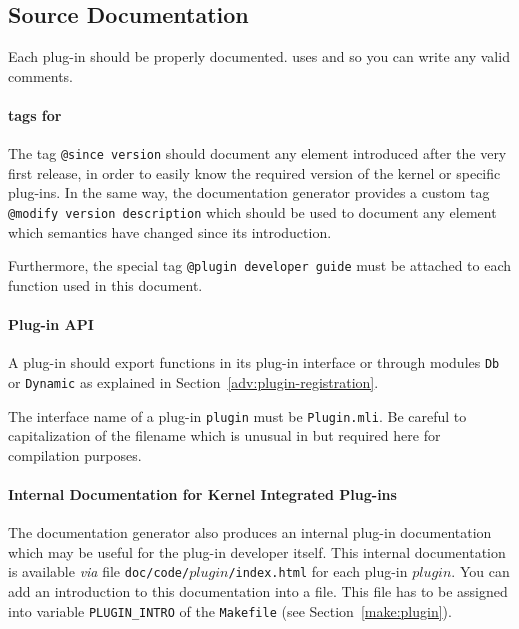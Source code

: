 \subsection{Source Documentation}\label{doc:plugin}

Each plug-in should be properly documented. \framac uses \ocamldoc and so you
can write any valid \ocamldoc comments.

\paragraph{\ocamldoc tags for \framac} The tag
\texttt{@since version} should document any element introduced after the very
first release, in order to easily know the required version of the \framac
kernel or specific plug-ins. In the same way, the \framac documentation
generator provides a custom tag \texttt{@modify version description} which
should be used to document any element which semantics have changed since its
introduction.

Furthermore, the special tag \texttt{@plugin developer guide} must be attached
to each function used in this document.

\paragraph{Plug-in API}

A plug-in should export functions in its plug-in interface or through modules
\texttt{Db} or \texttt{Dynamic} as explained in
Section~\ref{adv:plugin-registration}.

\begin{important}
The interface name of a plug-in \texttt{plugin} must be \texttt{Plugin.mli}. Be
careful to capitalization of the filename which is unusual in \caml but
required here for compilation purposes.
\end{important}

\paragraph{Internal Documentation for Kernel Integrated Plug-ins}

The \framac documentation generator also produces an internal plug-in
documentation which may be useful for the plug-in developer itself. This
internal documentation is available \emph{via} file
\texttt{doc/code/$plugin$/index.html} for each plug-in
$plugin$. You can add an introduction to this documentation into a file. This
file has to be assigned into variable
\texttt{PLUGIN\_INTRO} of the
\texttt{Makefile} (see Section~\ref{make:plugin}).

